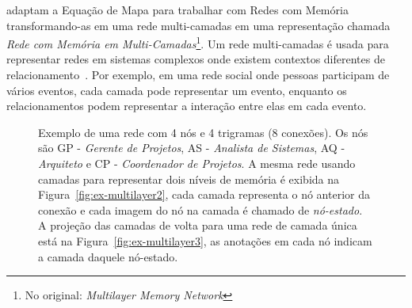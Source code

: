\documentclass[12pt,a4paper]{article}
\begin{document}
 adaptam a Equação de Mapa  para trabalhar com  Redes com Memória transformando-as em uma rede multi-camadas em uma representação chamada \textit{Rede com Memória em Multi-Camadas}\footnote{No original: \textit{Multilayer Memory Network}}. Um rede multi-camadas é usada para representar redes em sistemas complexos onde existem contextos diferentes de relacionamento~\cite{Kivela2014-pb}. Por exemplo, em uma rede social onde pessoas participam de vários eventos, cada camada pode representar um evento, enquanto os relacionamentos podem representar a interação entre elas em cada evento. 

\begin{figure}[htb]
    \centering
    \caption{Exemplo de uma rede com 4 nós e 4 trigramas (8 conexões). Os nós são GP - \textit{Gerente de Projetos}, AS - \textit{Analista de Sistemas}, AQ - \textit{Arquiteto} e CP - \textit{Coordenador de Projetos}. A mesma rede usando camadas para representar dois níveis de memória é exibida na Figura~\ref{fig:ex-multilayer2}, cada camada representa o nó anterior da conexão e cada imagem do nó na camada é chamado de \textit{nó-estado}. A projeção das camadas de volta para uma rede de camada única está na Figura~\ref{fig:ex-multilayer3}, as anotações em cada nó indicam a camada daquele nó-estado.}
    \label{fig:ex-multilayer-camadas}
\end{figure}
\end{document}
